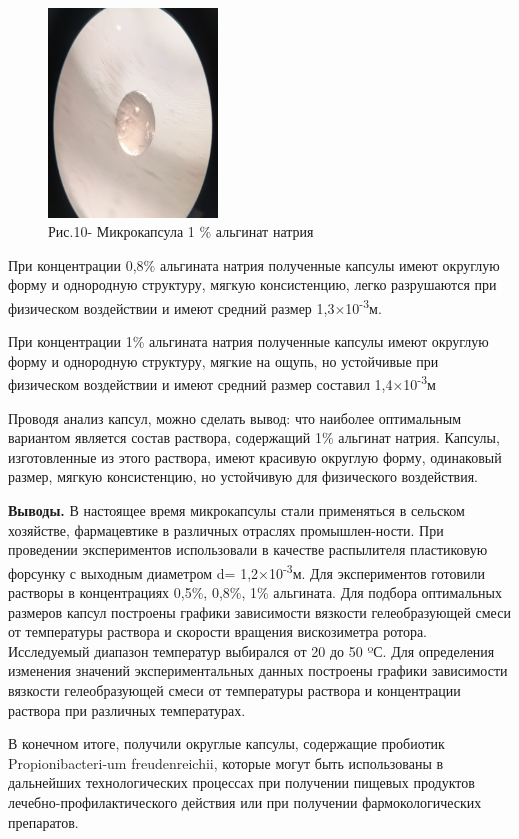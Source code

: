 \begin{figure}[H]
	\centering
	\includegraphics[width=0.4\textwidth]{assets/325}
	\caption*{Рис.10- Микрокапсула 1 \% альгинат натрия}
\end{figure}

\begin{multicols}{2}

При концентрации 0,8\% альгината натрия полученные капсулы имеют
округлую форму и однородную структуру, мягкую консистенцию, легко
разрушаются при физическом воздействии и имеют средний размер
1,3×10\textsuperscript{-3}м.


При концентрации 1\% альгината натрия полученные капсулы имеют округлую
форму и однородную структуру, мягкие на ощупь, но устойчивые при
физическом воздействии и имеют средний размер составил
1,4×10\textsuperscript{-3}м

Проводя анализ капсул, можно сделать вывод: что наиболее оптимальным
вариантом является состав раствора, содержащий 1\% альгинат натрия.
Капсулы, изготовленные из этого раствора, имеют красивую округлую форму,
одинаковый размер, мягкую консистенцию, но устойчивую для физического
воздействия.

{\bfseries Выводы.} В настоящее время микрокапсулы стали применяться в
сельском хозяйстве, фармацевтике в различных отраслях промышлен-ности.
При проведении экспериментов использовали в качестве распылителя
пластиковую форсунку с выходным диаметром d=
1,2×10\textsuperscript{-3}м. Для экспериментов готовили растворы в
концентрациях 0,5\%, 0,8\%, 1\% альгината. Для подбора оптимальных
размеров капсул построены графики зависимости вязкости гелеобразующей
смеси от температуры раствора и скорости вращения вискозиметра ротора.
Исследуемый диапазон температур выбирался от 20 до 50 ºС. Для
определения изменения значений экспериментальных данных построены
графики зависимости вязкости гелеобразующей смеси от температуры
раствора и концентрации раствора при различных температурах.

В конечном итоге, получили округлые капсулы, содержащие пробиотик
Propionibacteri-um freudenreichii, которые могут быть использованы в
дальнейших технологических процессах при получении пищевых продуктов
лечебно-профилактического действия или при получении фармокологических
препаратов.

\end{multicols}



